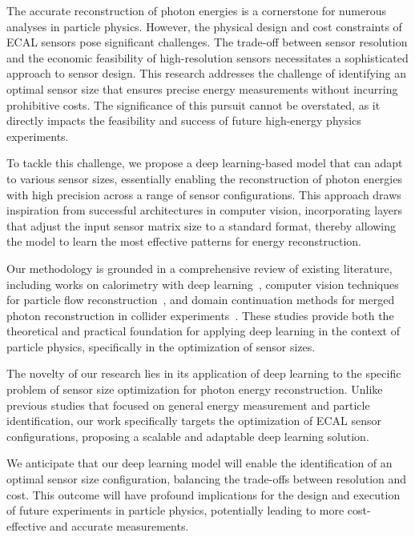 \documentclass[conference]{IEEEtran}
\begin{document}
The accurate reconstruction of photon energies is a cornerstone for numerous analyses in particle physics. However, the physical design and cost constraints of ECAL sensors pose significant challenges. The trade-off between sensor resolution and the economic feasibility of high-resolution sensors necessitates a sophisticated approach to sensor design. This research addresses the challenge of identifying an optimal sensor size that ensures precise energy measurements without incurring prohibitive costs. The significance of this pursuit cannot be overstated, as it directly impacts the feasibility and success of future high-energy physics experiments.

To tackle this challenge, we propose a deep learning-based model that can adapt to various sensor sizes, essentially enabling the reconstruction of photon energies with high precision across a range of sensor configurations. This approach draws inspiration from successful architectures in computer vision, incorporating layers that adjust the input sensor matrix size to a standard format, thereby allowing the model to learn the most effective patterns for energy reconstruction.

Our methodology is grounded in a comprehensive review of existing literature, including works on calorimetry with deep learning~\cite{Belayneh_2020}, computer vision techniques for particle flow reconstruction~\cite{Di_Bello_2021}, and domain continuation methods for merged photon reconstruction in collider experiments~\cite{PhysRevD.108.052002}. These studies provide both the theoretical and practical foundation for applying deep learning in the context of particle physics, specifically in the optimization of sensor sizes.

The novelty of our research lies in its application of deep learning to the specific problem of sensor size optimization for photon energy reconstruction. Unlike previous studies that focused on general energy measurement and particle identification, our work specifically targets the optimization of ECAL sensor configurations, proposing a scalable and adaptable deep learning solution.

We anticipate that our deep learning model will enable the identification of an optimal sensor size configuration, balancing the trade-offs between resolution and cost. This outcome will have profound implications for the design and execution of future experiments in particle physics, potentially leading to more cost-effective and accurate measurements.
\end{document}
